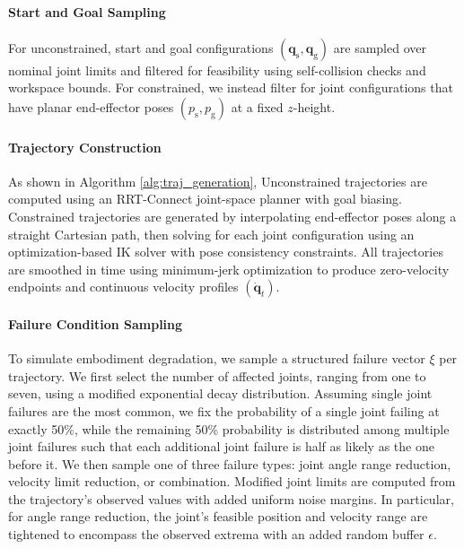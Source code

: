 \paragraph{Start and Goal Sampling}
For unconstrained, start and goal configurations $(\mathbf{q}_\text{s}, \mathbf{q}_\text{g})$ are sampled over nominal joint limits and filtered for feasibility using self-collision checks and workspace bounds. For constrained, we instead filter for joint configurations that have planar end-effector poses $(p_\text{s}, p_\text{g})$ at a fixed $z$-height.

\paragraph{Trajectory Construction}
As shown in Algorithm \ref{alg:traj_generation}, Unconstrained trajectories are computed using an RRT-Connect joint-space planner with goal biasing. Constrained trajectories are generated by interpolating end-effector poses along a straight Cartesian path, then solving for each joint configuration using an optimization-based IK solver with pose consistency constraints. All trajectories are smoothed in time using minimum-jerk optimization to produce zero-velocity endpoints and continuous velocity profiles $(\dot{\mathbf{q}}_t)$.


\paragraph{Failure Condition Sampling}
To simulate embodiment degradation, we sample a structured failure vector $\xi$ per trajectory. We first select the number of affected joints, ranging from one to seven, using a modified exponential decay distribution. Assuming  single joint failures are the most common, we fix the probability of a single joint failing at exactly 50\%, while the remaining 50\% probability is distributed among multiple joint failures such that each additional joint failure is half as likely as the one before it. We then sample one of three failure types: joint angle range reduction, velocity limit reduction, or combination. Modified joint limits are computed from the trajectory’s observed values with added uniform noise margins. In particular, for angle range reduction, the joint's feasible position and velocity range are tightened to encompass the observed extrema with an added random buffer  $\epsilon $.


